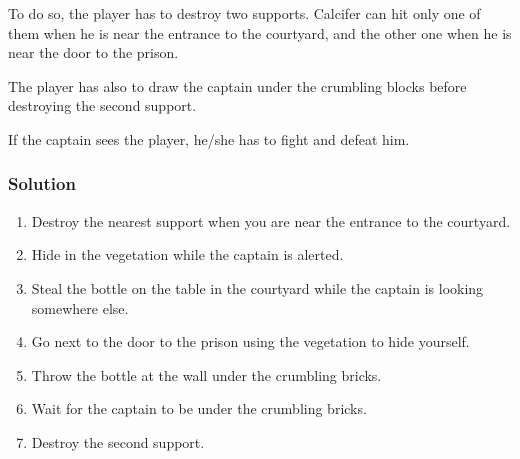 To do so, the player has to destroy two supports. Calcifer can hit only one of them when he is near the entrance to the courtyard, and the other one when he is near the door to the prison.

The player has also to draw the captain under the crumbling blocks before destroying the second support.

If the captain sees the player, he/she has to fight and defeat him.

\subsubsection*{Solution}
\begin{enumerate}
	\item Destroy the nearest support when you are near the entrance to the courtyard.
	\item Hide in the vegetation while the captain is alerted.
	\item Steal the bottle on the table in the courtyard while the captain is looking somewhere else.
	\item Go next to the door to the prison using the vegetation to hide yourself.
	\item Throw the bottle at the wall under the crumbling bricks.
	\item Wait for the captain to be under the crumbling bricks.
	\item Destroy the second support.
\end{enumerate}

